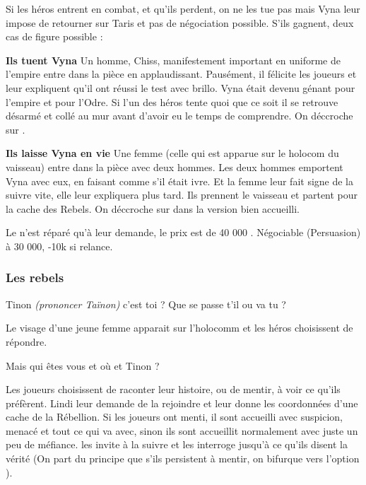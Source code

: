 Si les héros entrent en combat, et qu'ils perdent, on ne les tue pas mais Vyna leur impose de retourner sur Taris et pas de négociation possible. S'ils gagnent, deux cas de figure possible :
\begin{rebelist}
    \item \textbf{Ils tuent Vyna} Un homme, Chiss, manifestement important en uniforme de l'empire entre dans la pièce en applaudissant. Pausément, il félicite les joueurs et   leur expliquent qu'il ont réussi le test avec brillo. Vyna était devenu génant pour l'empire et pour l'Odre. Si l'un des héros tente quoi que ce soit il se retrouve désarmé et collé au mur avant d'avoir eu le temps de comprendre. On déccroche sur .

    \item \textbf{Ils laisse Vyna en vie} Une femme (celle qui est apparue sur le holocom du vaisseau) entre dans la pièce avec deux hommes. Les deux hommes emportent Vyna avec eux, en faisant comme s'il était ivre. Et la femme leur fait signe de la suivre vite, elle leur expliquera plus tard. Ils prennent le vaisseau et partent pour la cache des Rebels. On déccroche sur  dans la version bien accueilli.
\end{rebelist}

Le  n'est réparé qu'à leur demande, le prix est de 40 000 \crg. Négociable (Persuasion) à 30 000, -10k si relance.


\subsubsection{Les rebels} \label{sec:les-rebels}

\begin{quotebox}
    Tinon \emph{(prononcer Taïnon)} c’est toi ? Que se passe t’il ou va tu ?
\end{quotebox}

Le visage d’une jeune femme apparait sur l’holocomm et les héros choisissent de répondre.

\begin{quotebox}
    Mais qui êtes vous et où et Tinon ?
\end{quotebox}
Les joueurs choisissent de raconter leur histoire, ou de mentir, à voir ce qu'ils préfèrent. Lindi leur demande de la rejoindre et leur donne les coordonnées d'une cache de la Rébellion. Si les joueurs ont menti, il sont accueilli avec suspicion, menacé et tout ce qui va avec, sinon ils sont accueillit normalement avec juste un peu de méfiance.  les invite à la suivre et les interroge jusqu'à ce qu'ils disent la vérité (On part du principe que s'ils persistent à mentir, on bifurque vers l'option ).

